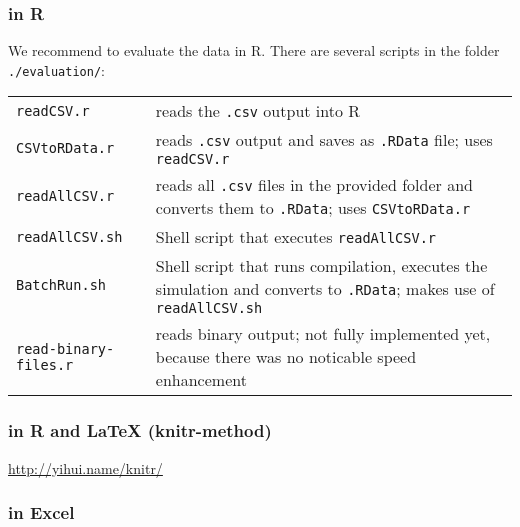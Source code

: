 \subsubsection{\label{sec:R}in R }

We recommend to evaluate the data in R. There are several scripts in the folder \texttt{./evaluation/}:

\begin{tabulary}{\textwidth}{lL}
\texttt{readCSV.r} & reads the \texttt{.csv} output into R \\
\texttt{CSVtoRData.r} & reads \texttt{.csv} output and saves as \texttt{.RData} file; uses \texttt{readCSV.r} \\
\texttt{readAllCSV.r} & reads all \texttt{.csv} files in the provided folder and converts them to \texttt{.RData}; uses \texttt{CSVtoRData.r} \\
\texttt{readAllCSV.sh} & Shell script that executes \texttt{readAllCSV.r} \\
\texttt{BatchRun.sh} & Shell script that runs compilation, executes the simulation and converts to \texttt{.RData}; makes use of \texttt{readAllCSV.sh} \\
\texttt{read-binary-files.r} & reads binary output; not fully implemented yet, because there was no noticable speed enhancement \\


\end{tabulary}


\subsubsection{in R and \protect\LaTeX{} (knitr-method) \label{knitr}}

\url{http://yihui.name/knitr/}

\subsubsection{in Excel}